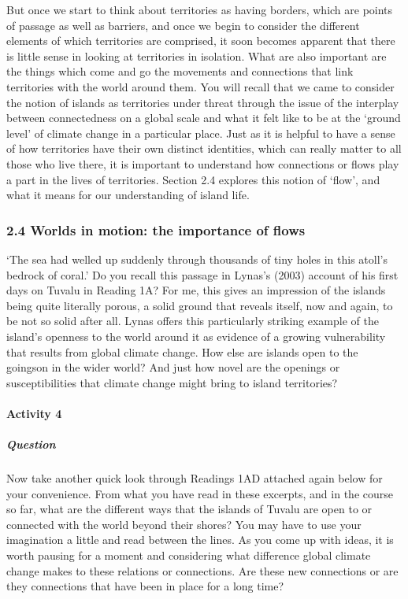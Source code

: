 \documentclass[letterpaper,10pt,english]{sphinxmanual}
\begin{document}
But once we start to think about territories as having borders, which are points of passage as well as barriers, and once we begin to consider the different elements of which territories are comprised, it soon becomes apparent that there is little sense in looking at territories in isolation. What are also important are the things which come and go \textendash{} the movements and connections that link territories with the world around them. You will recall that we came to consider the notion of islands as
territories under threat through the issue of the interplay between connectedness \textendash{} on a global scale \textendash{} and what it felt like to be at the ‘ground level’ of climate change in a particular place. Just as it is helpful to have a sense of how territories have their own distinct identities, which can really matter to all those who live there, it is important to understand how connections or flows play a part in the lives of territories. Section 2.4 explores this notion of ‘flow’, and what it means
for our understanding of island life.


\subsubsection{2.4 Worlds in motion: the importance of flows}
\label{\detokenize{content/session_00/Part_00_02:2.4-Worlds-in-motion:-the-importance-of-flows}}
‘The sea had welled up suddenly through thousands of tiny holes in this atoll’s bedrock of coral.’ Do you recall this passage in Lynas’s (2003) account of his first days on Tuvalu in Reading 1A? For me, this gives an impression of the islands being quite literally porous, a solid ground that reveals itself, now and again, to be not so solid after all. Lynas offers this particularly striking example of the island’s openness to the world around it as evidence of a growing vulnerability that
results from global climate change. How else are islands open to the goings\sphinxhyphen{}on in the wider world? And just how novel are the openings or susceptibilities that climate change might bring to island territories?


\paragraph{Activity 4}
\label{\detokenize{content/session_00/Part_00_02:Activity-4}}

\subparagraph{Question}
\label{\detokenize{content/session_00/Part_00_02:id2}}
Now take another quick look through Readings 1A\textendash{}D attached again below for your convenience. From what you have read in these excerpts, and in the course so far, what are the different ways that the islands of Tuvalu are open to or connected with the world beyond their shores? You may have to use your imagination a little and read between the lines. As you come up with ideas, it is worth pausing for a moment and considering what difference global climate change makes to these relations or
connections. Are these new connections \textendash{} or are they connections that have been in place for a long time?
\end{document}
